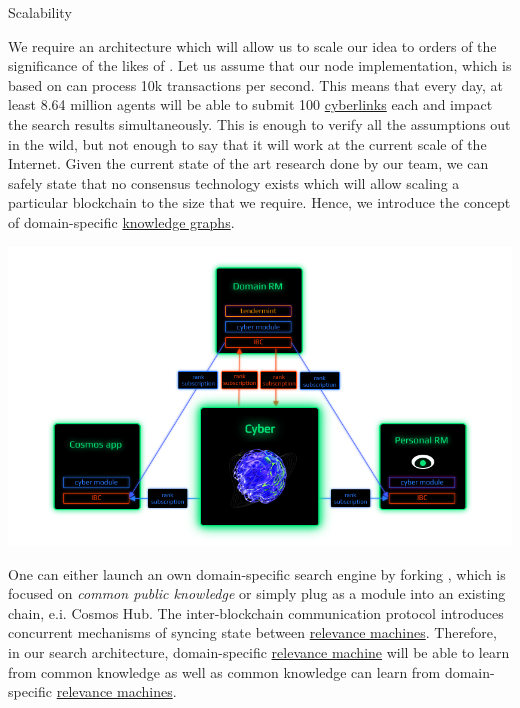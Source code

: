 \documentclass[8pt,oneside]{amsart}
\makeatletter
\newcommand{\linkred}[2]{\href{#1}{\color{red}{#2}}}
\renewcommand\subsection{\@startsection{subsection}
                                    {2}{\z@}
                                    {-3.25ex\@plus -1ex \@minus -.2ex}
                                    {0ex \@plus .2ex}
                                    {\play\Large}
                        }
\newcommand{\titleSection}[1]{\subsection{#1}}
\newenvironment{Figure}
  {\par\medskip\noindent\minipage{\linewidth}}
  {\endminipage\par\medskip}
\makeatother
\begin{document}
\titleSection{Scalability}\label{scalability}

We require an architecture which will allow us to scale our idea to orders of the significance of the likes of \linkred{https://google.com}{Google}. Let us assume that our node implementation, which is based on \linkred{https://github.com/cosmos/cosmos-sdk}{cosmos-sdk} can process 10k transactions per second. This means that every day, at least 8.64 million agents will be able to submit 100 {\hyperref[cyberlinks]{cyberlinks}} each and impact the search results simultaneously. This is enough to verify all the assumptions out in the wild, but not enough to say that it will work at the current scale of the Internet. Given the current state of the art research done by our team, we can safely state that no consensus technology exists which will allow scaling a particular blockchain to the size that we require. Hence, we introduce the concept of domain-specific {\hyperref[knowledge-graph]{knowledge graphs}}.

\begin{Figure}
    \centering
    \includegraphics[width=1\textwidth]{network.png}
\end{Figure}

One can either launch an own domain-specific search engine by forking \linkred{https://github.com/cybercongress/cyberd}{cyberd}, which is focused on \textit{common public knowledge} or simply plug \linkred{https://github.com/cybercongress/cyberd}{cyberd} as a module into an existing chain, e.i. Cosmos Hub. The inter-blockchain communication protocol introduces concurrent mechanisms of syncing state between {\hyperref[relevance-machine]{relevance machines}}. Therefore, in our search architecture, domain-specific {\hyperref[relevance-machine]{relevance machine}} will be able to learn from common knowledge as well as common knowledge can learn from domain-specific {\hyperref[relevance-machine]{relevance machines}}.
\end{document}
